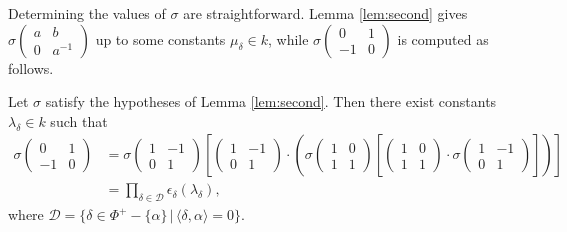 Determining the values of $\sigma$ are straightforward. Lemma \ref{lem:second} gives $\sigma\left(\begin{matrix}a & b \\ 0 & a^{-1}\end{matrix}\right)$ up to some constants $\mu_\delta\in k$, while $\sigma\left(\begin{matrix}0 & 1\\-1 & 0\end{matrix}\right)$ is computed as follows.
\begin{proposition} \label{prop:A}
Let $\sigma$ satisfy the hypotheses of Lemma \ref{lem:second}. Then there exist constants $\lambda_\delta\in k$ such that
\begin{align}
	\sigma\left(\begin{matrix}0 & 1 \\ -1 & 0\end{matrix}\right) &=
	\sigma
		\left(\begin{matrix} 1 & -1\\ 0 & 1\end{matrix}\right)
	\left[
		\left(\begin{matrix} 1 & -1\\ 0 & 1\end{matrix}\right)\cdot
		\left(
		\sigma
		\left(\begin{matrix} 1 & 0\\ 1 & 1\end{matrix}\right)
		\left[
		\left(\begin{matrix} 1 & 0\\ 1 & 1\end{matrix}\right)\cdot
		\sigma\left(\begin{matrix} 1 & -1\\ 0 & 1\end{matrix}\right)\right]
		\right)
	\right] \label{prop:A:eqn1}\\
	&= \prod_{\delta\in\mathcal{D}} \epsilon_\delta(\lambda_\delta),\label{prop:A:eqn2}
\end{align}
where $\mathcal{D} = \{\delta\in \Phi^+-\{\alpha\}\,|\,\langle\delta,\alpha\rangle = 0\}$.
\end{proposition}
